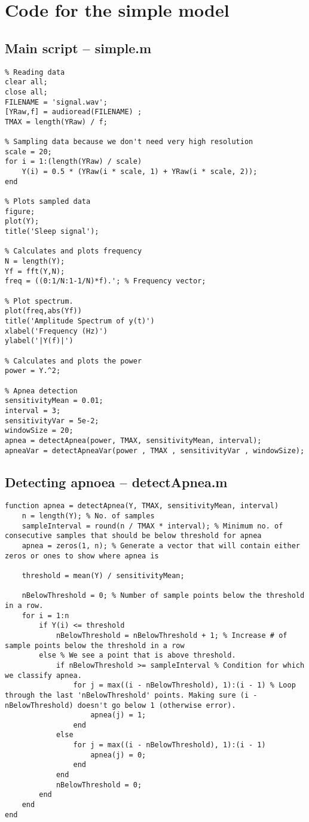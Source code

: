 \chapter{Code for the simple model}
\label{ch:simpleCode}

\section{Main script -- simple.m}
\label{sec:simple}
\begin{lstlisting}
% Reading data
clear all;
close all;
FILENAME = 'signal.wav';
[YRaw,f] = audioread(FILENAME) ;
TMAX = length(YRaw) / f;

% Sampling data because we don't need very high resolution
scale = 20;
for i = 1:(length(YRaw) / scale)
    Y(i) = 0.5 * (YRaw(i * scale, 1) + YRaw(i * scale, 2));
end

% Plots sampled data
figure;
plot(Y);
title('Sleep signal');

% Calculates and plots frequency
N = length(Y);
Yf = fft(Y,N);
freq = ((0:1/N:1-1/N)*f).'; % Frequency vector;

% Plot spectrum.
plot(freq,abs(Yf)) 
title('Amplitude Spectrum of y(t)')
xlabel('Frequency (Hz)')
ylabel('|Y(f)|')

% Calculates and plots the power
power = Y.^2;

% Apnea detection
sensitivityMean = 0.01;
interval = 3;
sensitivityVar = 5e-2;
windowSize = 20;
apnea = detectApnea(power, TMAX, sensitivityMean, interval);
apneaVar = detectApneaVar(power , TMAX , sensitivityVar , windowSize);
\end{lstlisting}

\section{Detecting apnoea -- detectApnea.m}
\label{sec:detectApnea}
\begin{lstlisting}
function apnea = detectApnea(Y, TMAX, sensitivityMean, interval)
    n = length(Y); % No. of samples
    sampleInterval = round(n / TMAX * interval); % Minimum no. of consecutive samples that should be below threshold for apnea
    apnea = zeros(1, n); % Generate a vector that will contain either zeros or ones to show where apnea is
    
    threshold = mean(Y) / sensitivityMean;
    
    nBelowThreshold = 0; % Number of sample points below the threshold in a row.
	for i = 1:n
        if Y(i) <= threshold
            nBelowThreshold = nBelowThreshold + 1; % Increase # of sample points below the threshold in a row
        else % We see a point that is above threshold.
            if nBelowThreshold >= sampleInterval % Condition for which we classify apnea.
                for j = max((i - nBelowThreshold), 1):(i - 1) % Loop through the last 'nBelowThreshold' points. Making sure (i - nBelowThreshold) doesn't go below 1 (otherwise error).
                    apnea(j) = 1;
                end
            else
                for j = max((i - nBelowThreshold), 1):(i - 1)
                    apnea(j) = 0;
                end
            end
            nBelowThreshold = 0;
        end
    end
end
\end{lstlisting}

